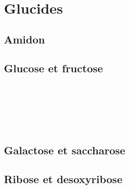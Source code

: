 \section{Glucides}

\subsection{Amidon}

\begin{boiteCodeTex}{}
  \chemfig{!\amylopectineHaw}
\end{boiteCodeTex}

\subsection{Glucose et fructose}

\begin{boiteCodeTex}{}
  \chemfig{!\glucoseHaw}
  \chemfig{!\glucoseCycle} \\
  \chemfig{!\glucose} \\[8pt]
  \chemfig{!\glucoseSemiDev}
\end{boiteCodeTex}

\begin{boiteCodeTex}{}
  \chemfig{!\fructoseHaw}
  \chemfig{!\fructofuranoseHaw}
  \chemfig{!\fructoseCycle} \\
  \chemfig{!\fructose} \\[8pt]
  \chemfig{!\fructoseSemiDev}
\end{boiteCodeTex}

\subsection{Galactose et saccharose}

\begin{boiteCodeTex}{}
  \chemfig{!\galactoseHaw}
  \chemfig{!\saccharoseHaw}
\end{boiteCodeTex}

\subsection{Ribose et desoxyribose}

\begin{boiteCodeTex}{}
\end{boiteCodeTex}
